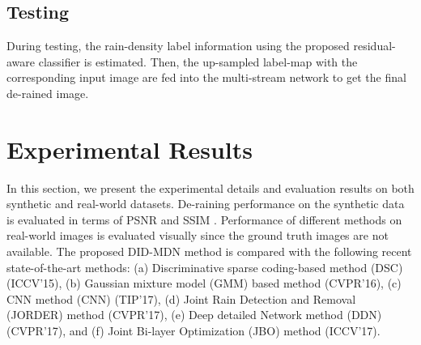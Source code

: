 \documentclass[10pt,twocolumn,letterpaper]{article}
\begin{document}
 
 
\subsection{Testing}
During testing, the rain-density label information using the proposed residual-aware classifier  is estimated. Then,  the up-sampled label-map with the corresponding input image are fed into the multi-stream network to get the final de-rained image.  



 

 
\section{Experimental Results}
\label{sec:exp}
In this section, we present the  experimental  details and  evaluation  results  on both synthetic and real-world datasets.   De-raining performance on the synthetic data is evaluated in terms of PSNR and SSIM \cite{ssim}.  Performance of different methods on real-world images is evaluated visually since the ground truth images are not available.   The proposed DID-MDN method is compared  with the following recent state-of-the-art methods: (a) Discriminative sparse coding-based method (DSC) \cite{dis_rain_2015} (ICCV'15), (b) Gaussian mixture model (GMM) based method \cite{rain_2016_gmm} (CVPR'16), (c) CNN method (CNN) \cite{derain_tip17}  (TIP'17), (d) Joint Rain Detection and Removal (JORDER) method \cite{derain_cvpr2017_multi} (CVPR'17), (e) Deep detailed Network method (DDN) \cite{derain_cvpr2017} (CVPR'17), and (f) Joint Bi-layer Optimization (JBO) method \cite{derain_iccv17} (ICCV'17).
\end{document}

